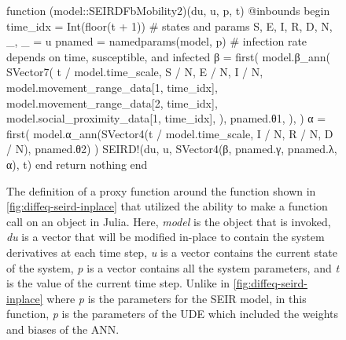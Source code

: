 \begin{figure}[!htb]
\centering
\begin{jllisting}
function (model::SEIRDFbMobility2)(du, u, p, t)
    @inbounds begin
        time_idx = Int(floor(t + 1))
        # states and params
        S, E, I, R, D, N, _, _ = u
        pnamed = namedparams(model, p)
        # infection rate depends on time, susceptible, and infected
        β = first(
            model.β_ann(
                SVector{7}(
                    t / model.time_scale,
                    S / N, E / N, I / N,
                    model.movement_range_data[1, time_idx],
                    model.movement_range_data[2, time_idx],
                    model.social_proximity_data[1, time_idx],
                ),
                pnamed.θ1,
            ),
        )
        α = first(
            model.α_ann(SVector{4}(t / model.time_scale,
                                   I / N, R / N, D / N),
                        pnamed.θ2)
        )
        SEIRD!(du, u, SVector{4}(β, pnamed.γ, pnamed.λ, α), t)
    end
    return nothing
end
\end{jllisting}
\caption[Julia implementation of the dynamics of the model third version]{The definition of a proxy function around the function shown in \autoref{fig:diffeq-seird-inplace} that utilized the ability to make a function call on an object in Julia. Here, \textit{model} is the object that is invoked, \textit{du} is a vector that will be modified in-place to contain the system derivatives at each time step, \textit{u} is a vector contains the current state of the system, \textit{p} is a vector contains all the system parameters, and \textit{t} is the value of the current time step. Unlike in \autoref{fig:diffeq-seird-inplace} where \textit{p} is the parameters for the SEIR model, in this function, \textit{p} is the parameters of the UDE which included the weights and biases of the ANN.}
\label{fig:diffeq-seird-fb2}
\end{figure}

